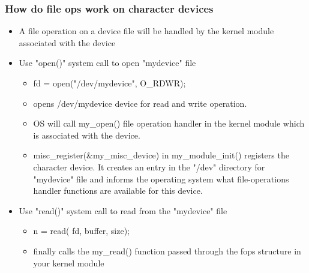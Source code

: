 \documentclass[12pt]{article}
\begin{document}
\subsubsection{How do file ops work on character devices}
\begin{itemize}
    \item A file operation on a device file will be handled by the kernel module associated with the device
    \item Use "open()" system call to open "mydevice" file \begin{itemize}
        \item fd = open("/dev/mydevice", O\_RDWR); 
        \item opens /dev/mydevice device for read and write operation. 
        \item OS will call my\_open() file operation handler in the kernel module which is associated with the device. 
        \item misc\_register(\&my\_misc\_device) in my\_module\_init() registers the character device. It creates an entry in the "/dev" directory for "mydevice" file and informs the operating system what file-operations handler functions are available for this device.
    \end{itemize}
    \item Use "read()" system call to read from the "mydevice" file \begin{itemize}
        \item n = read( fd, buffer, size);
        \item finally calls the my\_read() function passed through the fops structure in your kernel module
    \end{itemize}
\end{itemize}
\end{document}
